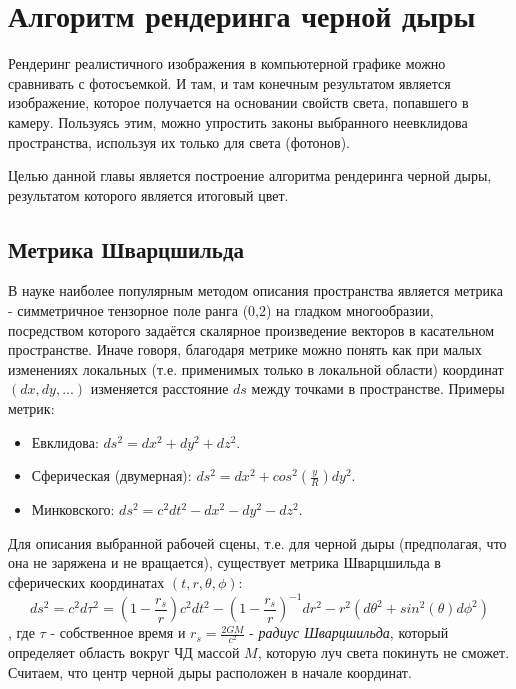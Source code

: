 \section{Алгоритм рендеринга черной дыры}
\label{sec:Chapter1} 

Рендеринг реалистичного изображения в компьютерной графике можно сравнивать с фотосъемкой. И там, и там конечным результатом является изображение, которое получается на основании свойств света, попавшего в камеру. Пользуясь этим, можно упростить законы выбранного неевклидова пространства, используя их только для света (фотонов).

Целью данной главы является построение алгоритма рендеринга черной дыры, результатом которого является итоговый цвет.

\subsection{Метрика Шварцшильда}

В науке наиболее популярным методом описания пространства является метрика - симметричное тензорное поле ранга (0,2) на гладком многообразии, посредством которого задаётся скалярное произведение векторов в касательном пространстве. Иначе говоря, благодаря метрике можно понять как при малых изменениях локальных (т.е. применимых только в локальной области) координат $(dx, dy, ...)$ изменяется расстояние $ds$ между точками в пространстве. Примеры метрик:
\begin{itemize}
  \item Евклидова: $ds^2=dx^2+dy^2+dz^2$.
  \item Сферическая (двумерная): $ds^2=dx^2+cos^2(\frac{y}{R})dy^2$.
  \item Минковского: $ds^2=c^2dt^2-dx^2-dy^2-dz^2$.
\end{itemize}

Для описания выбранной рабочей сцены, т.е. для черной дыры (предполагая, что она не заряжена и не вращается), существует метрика Шварцшильда в сферических координатах $(t, r, \theta, \phi)$:
\begin{equation}
\label{eq:schwarzschild_metric}
    ds^2 = c^2d\tau^2 = \left(1-\frac{r_s}{r}\right)c^{2}dt^{2} - \left(1-\frac{r_s}{r}\right)^{-1}dr^2 - r^2\left(d\theta^2+sin^2(\theta)d\phi^2\right)
\end{equation}
, где $\tau$ - собственное время и $r_s = \frac{2GM}{c^2}$ - \textit{радиус Шварцшильда}, который определяет область вокруг ЧД массой $M$, которую луч света покинуть не сможет. Считаем, что центр черной дыры расположен в начале координат.

